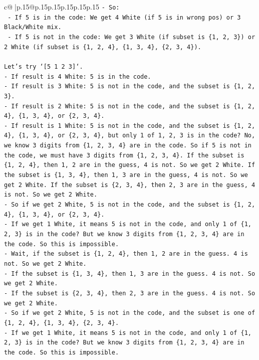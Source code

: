 \documentclass{article}
\begin{document}
{\begin{supertabular}{c@{$\;$}|p{.15\linewidth}@{}p{.15\linewidth}p{.15\linewidth}p{.15\linewidth}p{.15\linewidth}p{.15\linewidth}}
{{{\texttt{{-} So:} \\
\texttt{  {-} If 5 is in the code: We get 4 White (if 5 is in wrong pos) or 3 Black/White mix.} \\
\texttt{  {-} If 5 is not in the code: We get 3 White (if subset is \{1, 2, 3\}) or 2 White (if subset is \{1, 2, 4\}, \{1, 3, 4\}, \{2, 3, 4\}).} \\
\\ 
\texttt{Let's try `{[}5 1 2 3{]}`.} \\
\texttt{{-} If result is 4 White: 5 is in the code.} \\
\texttt{{-} If result is 3 White: 5 is not in the code, and the subset is \{1, 2, 3\}.} \\
\texttt{{-} If result is 2 White: 5 is not in the code, and the subset is \{1, 2, 4\}, \{1, 3, 4\}, or \{2, 3, 4\}.} \\
\texttt{{-} If result is 1 White: 5 is not in the code, and the subset is \{1, 2, 4\}, \{1, 3, 4\}, or \{2, 3, 4\}, but only 1 of 1, 2, 3 is in the code? No, we know 3 digits from \{1, 2, 3, 4\} are in the code. So if 5 is not in the code, we must have 3 digits from \{1, 2, 3, 4\}. If the subset is \{1, 2, 4\}, then 1, 2 are in the guess, 4 is not. So we get 2 White. If the subset is \{1, 3, 4\}, then 1, 3 are in the guess, 4 is not. So we get 2 White. If the subset is \{2, 3, 4\}, then 2, 3 are in the guess, 4 is not. So we get 2 White.} \\
\texttt{{-} So if we get 2 White, 5 is not in the code, and the subset is \{1, 2, 4\}, \{1, 3, 4\}, or \{2, 3, 4\}.} \\
\texttt{{-} If we get 1 White, it means 5 is not in the code, and only 1 of \{1, 2, 3\} is in the code? But we know 3 digits from \{1, 2, 3, 4\} are in the code. So this is impossible.} \\
\texttt{{-} Wait, if the subset is \{1, 2, 4\}, then 1, 2 are in the guess. 4 is not. So we get 2 White.} \\
\texttt{{-} If the subset is \{1, 3, 4\}, then 1, 3 are in the guess. 4 is not. So we get 2 White.} \\
\texttt{{-} If the subset is \{2, 3, 4\}, then 2, 3 are in the guess. 4 is not. So we get 2 White.} \\
\texttt{{-} So if we get 2 White, 5 is not in the code, and the subset is one of \{1, 2, 4\}, \{1, 3, 4\}, \{2, 3, 4\}.} \\
\texttt{{-} If we get 1 White, it means 5 is not in the code, and only 1 of \{1, 2, 3\} is in the code? But we know 3 digits from \{1, 2, 3, 4\} are in the code. So this is impossible.} \\
}}}
\end{supertabular}}
\end{document}

